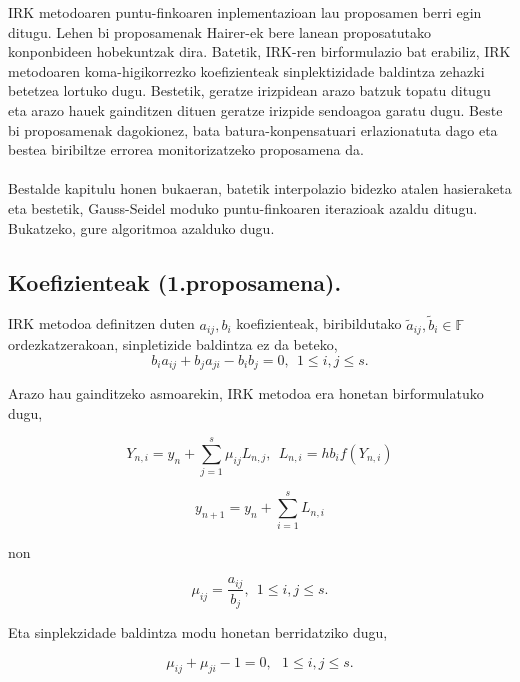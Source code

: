 IRK metodoaren puntu-finkoaren inplementazioan lau proposamen berri egin ditugu. Lehen bi proposamenak  Hairer-ek bere lanean proposatutako konponbideen hobekuntzak dira. Batetik, IRK-ren birformulazio bat erabiliz, IRK metodoaren koma-higikorrezko koefizienteak sinplektizidade baldintza zehazki betetzea lortuko dugu. Bestetik, geratze irizpidean arazo batzuk topatu ditugu eta arazo hauek gainditzen dituen geratze irizpide sendoagoa garatu dugu. Beste bi proposamenak dagokionez, bata batura-konpensatuari erlazionatuta dago eta bestea biribiltze errorea monitorizatzeko proposamena da.
\paragraph*{} Bestalde kapitulu honen bukaeran, batetik interpolazio bidezko atalen hasieraketa eta bestetik, Gauss-Seidel moduko puntu-finkoaren iterazioak azaldu ditugu. Bukatzeko, gure algoritmoa azalduko dugu.  

\subsection{Koefizienteak (1.proposamena).}

IRK metodoa definitzen duten $a_{ij},b_i$ koefizienteak, biribildutako $\tilde a_{ij},\tilde b_i \in \mathbb{F}$ ordezkatzerakoan, sinpletizide baldintza ez da beteko,
\begin{equation} \label{eq:61}
b_{i}a_{ij}+b_{j}a_{ji}-b_{i}b_{j}=0, \ \ 1 \leqslant i,j \leqslant s.
\end{equation}  
  
Arazo hau gainditzeko asmoarekin, IRK metodoa era honetan birformulatuko dugu,

\begin{equation}
\label{eq:62}
Y_{n,i}=y_n+ \sum\limits_{j=1}^{s} \mu_{ij} L_{n,j},  \ \ L_{n,i}=hb_if(Y_{n,i})
\end{equation}

\begin{equation}
\label{eq:63}
y_{n+1}=y_n+\sum\limits_{i=1}^{s} L_{n,i}
\end{equation}

non 

\begin{equation*}
\mu_{ij}=\frac{a_{ij}}{b_j}, \ \ 1 \le i,j \le s.
\end{equation*}

Eta sinplekzidade baldintza modu honetan berridatziko dugu,

\begin{equation}
\mu_{ij}+\mu_{ji}-1=0, \ \ \ 1 \le i,j \le s.
\end{equation}

